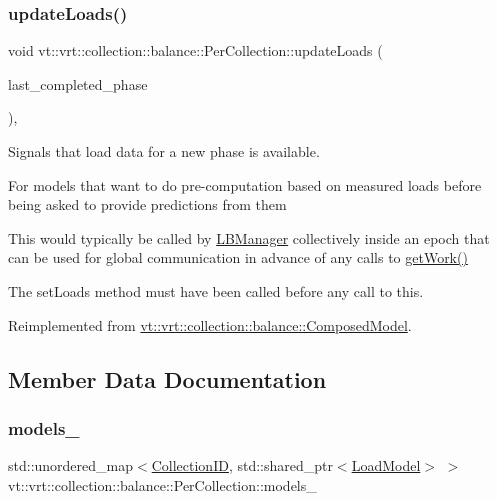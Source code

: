 \subsubsection{\texorpdfstring{update\+Loads()}{updateLoads()}}
{\footnotesize\ttfamily void vt\+::vrt\+::collection\+::balance\+::\+Per\+Collection\+::update\+Loads (\begin{DoxyParamCaption}\item[{\hyperlink{namespacevt_a46ce6733d5cdbd735d561b7b4029f6d7}{Phase\+Type}}]{last\+\_\+completed\+\_\+phase }\end{DoxyParamCaption})\hspace{0.3cm}{\ttfamily [override]}, {\ttfamily [virtual]}}



Signals that load data for a new phase is available. 

For models that want to do pre-\/computation based on measured loads before being asked to provide predictions from them

This would typically be called by \hyperlink{structvt_1_1vrt_1_1collection_1_1balance_1_1_l_b_manager}{L\+B\+Manager} collectively inside an epoch that can be used for global communication in advance of any calls to \hyperlink{structvt_1_1vrt_1_1collection_1_1balance_1_1_per_collection_abe527a6f5cd861eb21c251d7d6afad0f}{get\+Work()}

The {\ttfamily set\+Loads} method must have been called before any call to this. 

Reimplemented from \hyperlink{classvt_1_1vrt_1_1collection_1_1balance_1_1_composed_model_ad8108b4392d63b7f09e443920a64933a}{vt\+::vrt\+::collection\+::balance\+::\+Composed\+Model}.



\subsection{Member Data Documentation}
\mbox{\label{structvt_1_1vrt_1_1collection_1_1balance_1_1_per_collection_aec76660b4a44fe451a9546b4f4c50d3d}} 
\subsubsection{\texorpdfstring{models\+\_\+}{models\_}}
{\footnotesize\ttfamily std\+::unordered\+\_\+map$<$\hyperlink{structvt_1_1vrt_1_1collection_1_1balance_1_1_per_collection_ade08a6857f727a0a9d1ef63b25fc5b71}{Collection\+ID}, std\+::shared\+\_\+ptr$<$\hyperlink{structvt_1_1vrt_1_1collection_1_1balance_1_1_load_model}{Load\+Model}$>$ $>$ vt\+::vrt\+::collection\+::balance\+::\+Per\+Collection\+::models\+\_\+\hspace{0.3cm}{\ttfamily [private]}}



